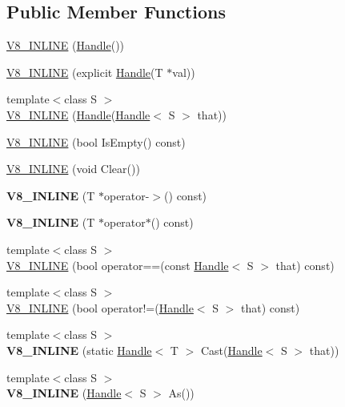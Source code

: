 \subsection*{Public Member Functions}
\begin{DoxyCompactItemize}
\item 
\hyperlink{classv8_1_1_handle_a0005cb917206b7e4800d19d4eca68e21}{V8\+\_\+\+I\+N\+L\+I\+N\+E} (\hyperlink{classv8_1_1_handle}{Handle}())
\item 
\hyperlink{classv8_1_1_handle_a1e20fd64391338cda4daabd6dcb569e8}{V8\+\_\+\+I\+N\+L\+I\+N\+E} (explicit \hyperlink{classv8_1_1_handle}{Handle}(T $\ast$val))
\item 
{\footnotesize template$<$class S $>$ }\\\hyperlink{classv8_1_1_handle_a947012938048fb8159ccdeb63b3e6a0f}{V8\+\_\+\+I\+N\+L\+I\+N\+E} (\hyperlink{classv8_1_1_handle}{Handle}(\hyperlink{classv8_1_1_handle}{Handle}$<$ S $>$ that))
\item 
\hyperlink{classv8_1_1_handle_a77848ecb0ef455dfd0d6c70b469f44d9}{V8\+\_\+\+I\+N\+L\+I\+N\+E} (bool Is\+Empty() const)
\item 
\hyperlink{classv8_1_1_handle_ad2464f7c221a91e14caa0343312e36f9}{V8\+\_\+\+I\+N\+L\+I\+N\+E} (void Clear())
\item 
\hypertarget{classv8_1_1_handle_ad0580b75ccf7af4cfb74b5e5c1bfb2fd}{}{\bfseries V8\+\_\+\+I\+N\+L\+I\+N\+E} (T $\ast$operator-\/$>$() const)\label{classv8_1_1_handle_ad0580b75ccf7af4cfb74b5e5c1bfb2fd}

\item 
\hypertarget{classv8_1_1_handle_aad1d16e28c0e6941172dc9dd24d3617a}{}{\bfseries V8\+\_\+\+I\+N\+L\+I\+N\+E} (T $\ast$operator$\ast$() const)\label{classv8_1_1_handle_aad1d16e28c0e6941172dc9dd24d3617a}

\item 
{\footnotesize template$<$class S $>$ }\\\hyperlink{classv8_1_1_handle_a00fd33d905ad71ac52982a7944600fa0}{V8\+\_\+\+I\+N\+L\+I\+N\+E} (bool operator==(const \hyperlink{classv8_1_1_handle}{Handle}$<$ S $>$ that) const)
\item 
{\footnotesize template$<$class S $>$ }\\\hyperlink{classv8_1_1_handle_a85f5fb0108672950759ccc99cc8348a8}{V8\+\_\+\+I\+N\+L\+I\+N\+E} (bool operator!=(\hyperlink{classv8_1_1_handle}{Handle}$<$ S $>$ that) const)
\item 
\hypertarget{classv8_1_1_handle_a7a264b2c3e58c4003f5968a7c0ef347e}{}{\footnotesize template$<$class S $>$ }\\{\bfseries V8\+\_\+\+I\+N\+L\+I\+N\+E} (static \hyperlink{classv8_1_1_handle}{Handle}$<$ T $>$ Cast(\hyperlink{classv8_1_1_handle}{Handle}$<$ S $>$ that))\label{classv8_1_1_handle_a7a264b2c3e58c4003f5968a7c0ef347e}

\item 
\hypertarget{classv8_1_1_handle_ad78a29a0d4766f2e0e0a4d95a047efc3}{}{\footnotesize template$<$class S $>$ }\\{\bfseries V8\+\_\+\+I\+N\+L\+I\+N\+E} (\hyperlink{classv8_1_1_handle}{Handle}$<$ S $>$ As())\label{classv8_1_1_handle_ad78a29a0d4766f2e0e0a4d95a047efc3}

\end{DoxyCompactItemize}
